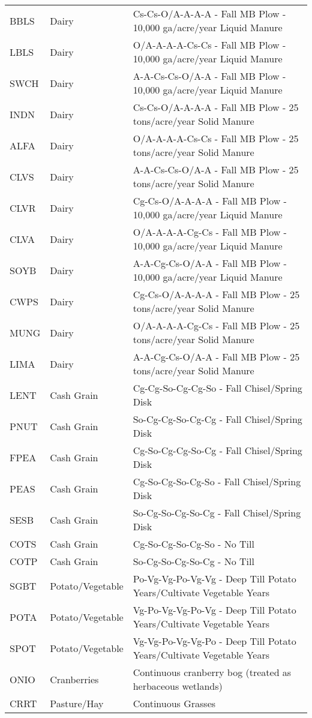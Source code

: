 \begin{landscape}
\begin{longtable}{l l l}
  BBLS & Dairy & Cs-Cs-O/A-A-A-A - Fall MB Plow - 10,000 ga/acre/year Liquid Manure \\ 
  LBLS & Dairy & O/A-A-A-A-Cs-Cs - Fall MB Plow - 10,000 ga/acre/year Liquid Manure \\ 
  SWCH & Dairy & A-A-Cs-Cs-O/A-A - Fall MB Plow - 10,000 ga/acre/year Liquid Manure \\ 
  INDN & Dairy & Cs-Cs-O/A-A-A-A - Fall MB Plow - 25 tons/acre/year Solid Manure \\ 
  ALFA & Dairy & O/A-A-A-A-Cs-Cs - Fall MB Plow - 25 tons/acre/year Solid Manure \\ 
  CLVS & Dairy & A-A-Cs-Cs-O/A-A - Fall MB Plow - 25 tons/acre/year Solid Manure \\ 
  CLVR & Dairy & Cg-Cs-O/A-A-A-A - Fall MB Plow - 10,000 ga/acre/year Liquid Manure \\ 
  CLVA & Dairy & O/A-A-A-A-Cg-Cs - Fall MB Plow - 10,000 ga/acre/year Liquid Manure \\ 
  SOYB & Dairy & A-A-Cg-Cs-O/A-A - Fall MB Plow - 10,000 ga/acre/year Liquid Manure \\ 
  CWPS & Dairy & Cg-Cs-O/A-A-A-A - Fall MB Plow - 25 tons/acre/year Solid Manure \\ 
  MUNG & Dairy & O/A-A-A-A-Cg-Cs - Fall MB Plow - 25 tons/acre/year Solid Manure \\ 
  LIMA & Dairy & A-A-Cg-Cs-O/A-A - Fall MB Plow - 25 tons/acre/year Solid Manure \\ 
  LENT & Cash Grain & Cg-Cg-So-Cg-Cg-So - Fall Chisel/Spring Disk \\ 
  PNUT & Cash Grain & So-Cg-Cg-So-Cg-Cg - Fall Chisel/Spring Disk \\ 
  FPEA & Cash Grain & Cg-So-Cg-Cg-So-Cg - Fall Chisel/Spring Disk \\ 
  PEAS & Cash Grain & Cg-So-Cg-So-Cg-So - Fall Chisel/Spring Disk \\ 
  SESB & Cash Grain & So-Cg-So-Cg-So-Cg - Fall Chisel/Spring Disk \\ 
  COTS & Cash Grain & Cg-So-Cg-So-Cg-So - No Till \\ 
  COTP & Cash Grain & So-Cg-So-Cg-So-Cg - No Till \\ 
  SGBT & Potato/Vegetable & Po-Vg-Vg-Po-Vg-Vg - Deep Till Potato Years/Cultivate Vegetable Years \\ 
  POTA & Potato/Vegetable & Vg-Po-Vg-Vg-Po-Vg - Deep Till Potato Years/Cultivate Vegetable Years \\ 
  SPOT & Potato/Vegetable & Vg-Vg-Po-Vg-Vg-Po - Deep Till Potato Years/Cultivate Vegetable Years \\
  ONIO & Cranberries      & Continuous cranberry bog (treated as herbaceous wetlands) \\ 
  CRRT & Pasture/Hay & Continuous Grasses
\label{tab:lnd_mgt_def}
\end{longtable}
\end{landscape}
